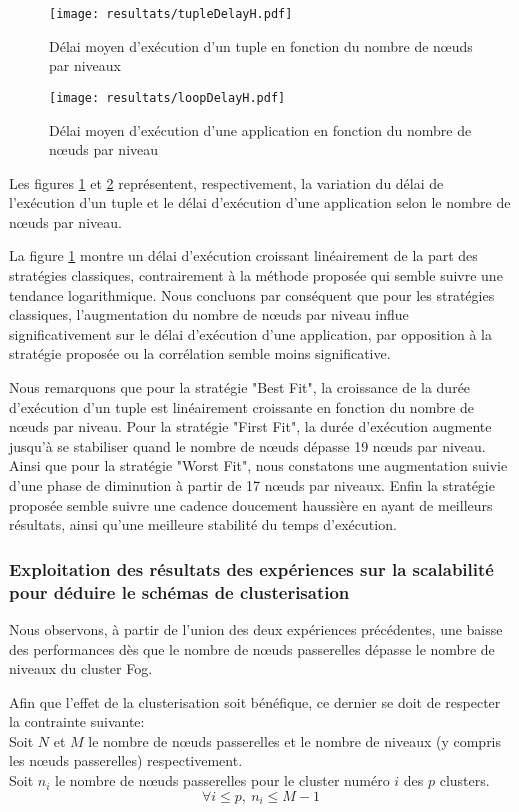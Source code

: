 \begin{figure}[H]
  \centering
  \texttt{[image: resultats/tupleDelayH.pdf]}
  \caption{Délai moyen d'exécution d'un tuple en fonction du nombre de nœuds par niveaux}
  \label{fig:delai_tuple_horizontal}
\end{figure}

\begin{figure}[H]
  \centering
  \texttt{[image: resultats/loopDelayH.pdf]}
  \caption{Délai moyen d'exécution d'une application en fonction du nombre de nœuds par niveau}
  \label{fig:delai_application_horizontal}
\end{figure}

Les figures \ref{fig:delai_tuple_horizontal} et \ref{fig:delai_application_horizontal} représentent, respectivement, la variation du délai de l'exécution d'un tuple et le délai d'exécution d'une application selon le nombre de nœuds par niveau.\par
La figure \ref{fig:delai_tuple_horizontal} montre un délai d'exécution croissant linéairement de la part des stratégies classiques, contrairement à la méthode proposée qui semble suivre une tendance logarithmique. Nous concluons par conséquent que pour les stratégies classiques, l'augmentation du nombre de nœuds par niveau influe significativement sur le délai d'exécution d'une application, par opposition à la stratégie proposée ou la corrélation semble moins significative.\par
Nous remarquons que pour la stratégie "Best Fit", la croissance de la durée d'exécution d'un tuple est linéairement croissante en fonction du nombre de nœuds par niveau. Pour la stratégie "First Fit", la durée d'exécution augmente jusqu'à se stabiliser quand le nombre de nœuds dépasse 19 nœuds par niveau. Ainsi que pour la stratégie "Worst Fit", nous constatons une augmentation suivie d'une phase de diminution à partir de 17 nœuds par niveaux. Enfin la stratégie proposée semble suivre une cadence doucement haussière en ayant de meilleurs résultats, ainsi qu'une meilleure stabilité du temps d'exécution.

\subsubsection{Exploitation des résultats des expériences sur la scalabilité pour déduire le schémas de clusterisation}
Nous observons, à partir de l'union des deux expériences précédentes, une baisse des performances dès que le nombre de nœuds passerelles dépasse le nombre de niveaux du cluster Fog.\par
Afin que l'effet de la clusterisation soit bénéfique, ce dernier se doit de respecter la contrainte suivante:\\
Soit $N$ et $M$ le nombre de nœuds passerelles et le nombre de niveaux (y compris les nœuds passerelles) respectivement.\\
Soit $n_i$ le nombre de nœuds passerelles pour le cluster numéro $i$ des $p$ clusters.\\
$$\forall i \le p,\ n_i \le M - 1$$

